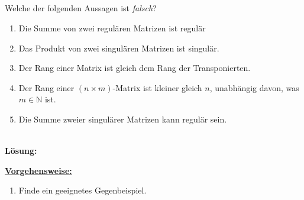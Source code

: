 \newpage
\subsection*{}
Welche der folgenden Aussagen ist \textit{falsch}?
\renewcommand{\labelenumi}{(\alph{enumi})}
\begin{enumerate}
	\item 
	Die Summe von zwei regulären Matrizen ist regulär
	\item
	Das Produkt von zwei singulären Matrizen ist singulär.
	
	\item
	Der Rang einer Matrix ist gleich dem Rang der Transponierten.
	\item
	Der Rang einer $ (n \times m) $-Matrix ist kleiner gleich $ n $, unabhängig davon, was $ m \in \mathbb{N} $ ist.
	\item 
	Die Summe zweier singulärer Matrizen kann regulär sein.
\end{enumerate}
\ \\
\textbf{Lösung:}
\begin{mdframed}
	\underline{\textbf{Vorgehensweise:}}
	\renewcommand{\labelenumi}{\theenumi.}
	\begin{enumerate}
		\item Finde ein geeignetes Gegenbeispiel. 
	\end{enumerate}
\end{mdframed}

